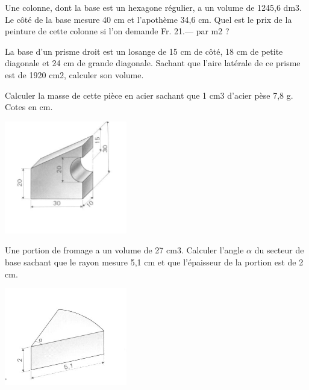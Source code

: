 \begin{exercice}
Une colonne, dont la base est un hexagone régulier, a un volume de 1245,6 dm3. Le côté de la base mesure 40 cm et l’apothème 34,6 cm. Quel est le prix de la peinture de cette colonne si l’on demande Fr. 21.— par m2 ?
\end{exercice}

\begin{exercice}
La base d’un prisme droit est un losange de 15 cm de côté, 18 cm de petite diagonale et 24 cm de grande diagonale. Sachant que l’aire latérale de ce prisme est de 1920 cm2, calculer son volume.
\end{exercice}

\begin{exercice}
Calculer la masse de cette pièce en acier sachant que 1 cm3 d’acier pèse 
7,8 g. Cotes en cm.
\begin{center}
\includegraphics[width= 0.4\textwidth]{volume/image/volume11.png}
\end{center}
\end{exercice}

\begin{exercice}
Une portion de fromage a un volume de 27 cm3. Calculer l’angle $\alpha $ du secteur de base sachant que le rayon mesure 5,1 cm et que l’épaisseur de la portion est de 2 cm. 
\begin{center}
\includegraphics[width= 0.4\textwidth]{volume/image/volume12.png}
\end{center}
\end{exercice}

